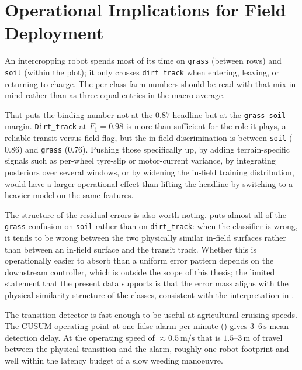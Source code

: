 \section{Operational Implications for Field Deployment}
\label{sec:disc_deployment}

An intercropping robot spends most of its time on \texttt{grass} (between rows) and \texttt{soil} (within the plot); it only crosses \texttt{dirt\_track} when entering, leaving, or returning to charge. The per-class farm numbers should be read with that mix in mind rather than as three equal entries in the macro average.

That puts the binding number not at the $0.87$ headline but at the \texttt{grass}--\texttt{soil} margin. \texttt{Dirt\_track} at $F_1 = 0.98$ is more than sufficient for the role it plays, a reliable transit-versus-field flag, but the in-field discrimination is between \texttt{soil} ($0.86$) and \texttt{grass} ($0.76$). Pushing those specifically up, by adding terrain-specific signals such as per-wheel tyre-slip or motor-current variance, by integrating posteriors over several windows, or by widening the in-field training distribution, would have a larger operational effect than lifting the headline by switching to a heavier model on the same features.

The structure of the residual errors is also worth noting.  puts almost all of the \texttt{grass} confusion on \texttt{soil} rather than on \texttt{dirt\_track}: when the classifier is wrong, it tends to be wrong between the two physically similar in-field surfaces rather than between an in-field surface and the transit track. Whether this is operationally easier to absorb than a uniform error pattern depends on the downstream controller, which is outside the scope of this thesis; the limited statement that the present data supports is that the error mass aligns with the physical similarity structure of the classes, consistent with the interpretation in .

The transition detector is fast enough to be useful at agricultural cruising speeds. The CUSUM operating point at one false alarm per minute () gives $3$--$6\,\text{s}$ mean detection delay. At the operating speed of $\approx\SI{0.5}{\meter\per\second}$ that is $1.5$--$3\,\text{m}$ of travel between the physical transition and the alarm, roughly one robot footprint and well within the latency budget of a slow weeding manoeuvre.

